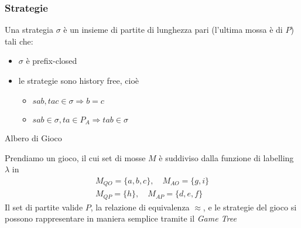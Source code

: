 \documentclass{beamer}
\begin{document}
\begin{frame}

	\frametitle{Strategie}
	
	Una strategia $\sigma$ è un insieme di partite di lunghezza pari (l'ultima mossa è di $P$) tali che:
	\begin{itemize}
		\item $\sigma$ è prefix-closed
		\item le strategie sono history free, cioè
		\begin{itemize}
			\item $sab , tac \in \sigma \Rightarrow b=c$
			\item $sab\in \sigma, ta\in P_A \Rightarrow tab\in \sigma$
		\end{itemize}

	\end{itemize}
	
	\begin{exampleblock}{Albero di Gioco}
 
	Prendiamo un gioco, il cui set di mosse $M$ è suddiviso dalla funzione di labelling $\lambda$ in
	  \begin{gather*}
	      M_{QO}=\{a,b,c\}, \quad  M_{AO}=\{g,i\} \\
	      M_{QP}=\{h\},    \quad  M_{AP}=\{d,e,f\}
          \end{gather*}  
	Il set di partite valide $P$, la relazione di equivalenza $\approx$, e le strategie del gioco si possono rappresentare in maniera semplice tramite il \emph{Game Tree}
	\end{exampleblock}
	
	
\end{frame}
\end{document}
